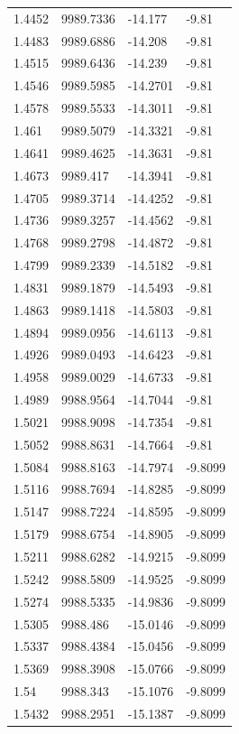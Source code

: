 \begin{table}[H]
\begin{tabular}{llll}
1.4452 & 9989.7336 & -14.177 & -9.81 \\
1.4483 & 9989.6886 & -14.208 & -9.81 \\
1.4515 & 9989.6436 & -14.239 & -9.81 \\
1.4546 & 9989.5985 & -14.2701 & -9.81 \\
1.4578 & 9989.5533 & -14.3011 & -9.81 \\
1.461 & 9989.5079 & -14.3321 & -9.81 \\
1.4641 & 9989.4625 & -14.3631 & -9.81 \\
1.4673 & 9989.417 & -14.3941 & -9.81 \\
1.4705 & 9989.3714 & -14.4252 & -9.81 \\
1.4736 & 9989.3257 & -14.4562 & -9.81 \\
1.4768 & 9989.2798 & -14.4872 & -9.81 \\
1.4799 & 9989.2339 & -14.5182 & -9.81 \\
1.4831 & 9989.1879 & -14.5493 & -9.81 \\
1.4863 & 9989.1418 & -14.5803 & -9.81 \\
1.4894 & 9989.0956 & -14.6113 & -9.81 \\
1.4926 & 9989.0493 & -14.6423 & -9.81 \\
1.4958 & 9989.0029 & -14.6733 & -9.81 \\
1.4989 & 9988.9564 & -14.7044 & -9.81 \\
1.5021 & 9988.9098 & -14.7354 & -9.81 \\
1.5052 & 9988.8631 & -14.7664 & -9.81 \\
1.5084 & 9988.8163 & -14.7974 & -9.8099 \\
1.5116 & 9988.7694 & -14.8285 & -9.8099 \\
1.5147 & 9988.7224 & -14.8595 & -9.8099 \\
1.5179 & 9988.6754 & -14.8905 & -9.8099 \\
1.5211 & 9988.6282 & -14.9215 & -9.8099 \\
1.5242 & 9988.5809 & -14.9525 & -9.8099 \\
1.5274 & 9988.5335 & -14.9836 & -9.8099 \\
1.5305 & 9988.486 & -15.0146 & -9.8099 \\
1.5337 & 9988.4384 & -15.0456 & -9.8099 \\
1.5369 & 9988.3908 & -15.0766 & -9.8099 \\
1.54 & 9988.343 & -15.1076 & -9.8099 \\
1.5432 & 9988.2951 & -15.1387 & -9.8099 \\

\end{tabular}
\end{table}
